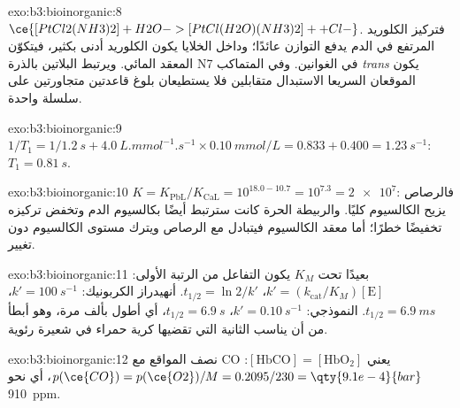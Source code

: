 \begin{solution}{exo:b3:bioinorganic:8}
$\ce{[PtCl2(NH3)2] + H2O -> [PtCl(H2O)(NH3)2]+ + Cl-}$. فتركيز الكلوريد المرتفع في الدم
يدفع التوازن عائدًا؛ وداخل الخلايا يكون الكلوريد أدنى بكثير، فيتكوّن المعقد
المائي. ويرتبط البلاتين بالذرة N7 في الغوانين. وفي المتماكب \textit{trans} يكون الموقعان
السريعا الاستبدال متقابلين فلا يستطيعان بلوغ قاعدتين متجاورتين على
سلسلة واحدة.
\end{solution}

\begin{solution}{exo:b3:bioinorganic:9}
$1/T_1 = 1/\qty{1.2}{s} + \qty{4.0}{L.mmol^{-1}.s^{-1}} \times \qty{0.10}{mmol/L} = 0.833 + 0.400 = \qty{1.23}{s^{-1}}$: $T_1 = \qty{0.81}{s}$.
\end{solution}

\begin{solution}{exo:b3:bioinorganic:10}
$K = K_{\mathrm{PbL}}/K_{\mathrm{CaL}} = 10^{18.0 - 10.7} = 10^{7.3} = \num{2e7}$: فالرصاص يزيح الكالسيوم كليًا. والربيطة
الحرة كانت سترتبط أيضًا بكالسيوم الدم وتخفض تركيزه
تخفيضًا خطرًا؛ أما معقد الكالسيوم فيتبادل مع الرصاص ويترك مستوى الكالسيوم
دون تغيير.
\end{solution}

\begin{solution}{exo:b3:bioinorganic:11}
بعيدًا تحت $K_M$ يكون التفاعل من الرتبة الأولى: $k' = (k_{\mathrm{cat}}/K_M)[\mathrm E]$، $t_{1/2} = \ln 2/k'$. أنهيدراز
الكربونيك: $k' = \qty{100}{s^{-1}}$، $t_{1/2} = \qty{6.9}{ms}$.  النموذجي: $k' = \qty{0.10}{s^{-1}}$، $t_{1/2} = \qty{6.9}{s}$، أي أطول بألف
مرة، وهو أبطأ من أن يناسب الثانية التي تقضيها كرية حمراء في شعيرة رئوية.
\end{solution}

\begin{solution}{exo:b3:bioinorganic:12}
نصف المواقع مع CO يعني $[\mathrm{HbCO}] = [\mathrm{HbO_2}]$: $p(\ce{CO}) = p(\ce{O2})/M = 0.2095/230 = \qty{9.1e-4}{bar}$، أي نحو
\qty{910}{ppm}.
\end{solution}

